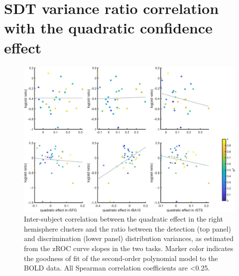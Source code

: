 \documentclass[12pt,twoside]{reedthesis}
\begin{document}
\hypertarget{app3:varianceRat}{%
\section{SDT variance ratio correlation with the quadratic confidence effect}\label{app3:varianceRat}}
\begin{figure}[H]
\includegraphics[width=\linewidth]{figure/fMRI/varianceRatio} \caption[Inter-subject correlation between the quadratic effect in the right hemisphere clusters and the ratio between the detection and discrimination distribution variances]{Inter-subject correlation between the quadratic effect in the right hemisphere clusters and the ratio between the detection (top panel) and discrimination (lower panel) distribution variances, as estimated from the zROC curve slopes in the two tasks. Marker color indicates the goodness of fit of the second-order polynomial model to the BOLD data. All Spearman correlation coefficients are <0.25.}\label{fig:varianceRat}
\end{figure}
\newpage
\end{document}
